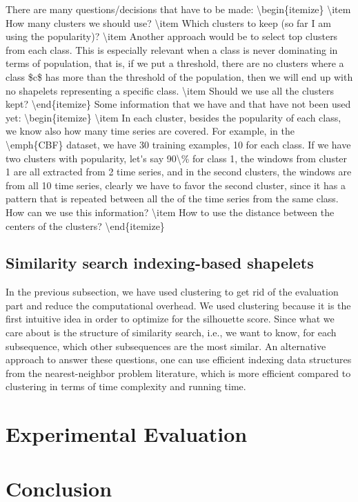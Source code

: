 \documentclass[sigconf, nonacm]{acmart}
\begin{document}
\ac{
	There are many questions/decisions that have to be made:
	\begin{itemize}
		\item How many clusters we should use?
		\item Which clusters to keep (so far I am using the popularity)?
    \item Another approach would be to select top clusters from each class. This
      is especially relevant when a class is never dominating in terms of 
      population, that is, if we put a threshold, there are no clusters
      where a class $c$ has more than the threshold of the population, then we
      will end up with no shapelets representing a specific class.
		\item Should we use all the clusters kept?
	\end{itemize}
	Some information that we have and that have not been used yet:
	\begin{itemize}
		\item In each cluster, besides the popularity of each class, we know also
		      how many time series are covered. For example, in the \emph{CBF}
		      dataset, we have 30 training examples, 10 for each class. If we have
		      two clusters with popularity, let's say 90\% for class 1, the windows
		      from cluster 1 are all extracted from 2 time series, and in the second
		      clusters, the windows are from all 10 time series, clearly we have to
		      favor the second cluster, since it has a pattern that is repeated
		      between all the of the time series from the same class. How can we
		      use this information?
		\item How to use the distance between the centers of the clusters?
	\end{itemize}
}

\subsection{Similarity search indexing-based shapelets}
In the previous subsection, we have used clustering to get rid of the evaluation
part and reduce the computational overhead. We used clustering because it is the
first intuitive idea in order to optimize for the silhouette score.
Since what we care about is the structure of similarity search, i.e., we want to
know, for each subsequence, which other subsequences are the most similar. An
alternative approach to answer these questions, one can use efficient indexing
data structures from the nearest-neighbor problem literature, which is more 
efficient compared to clustering in terms of time complexity and running time.

\section{Experimental Evaluation}

\section{Conclusion}




\end{document}
